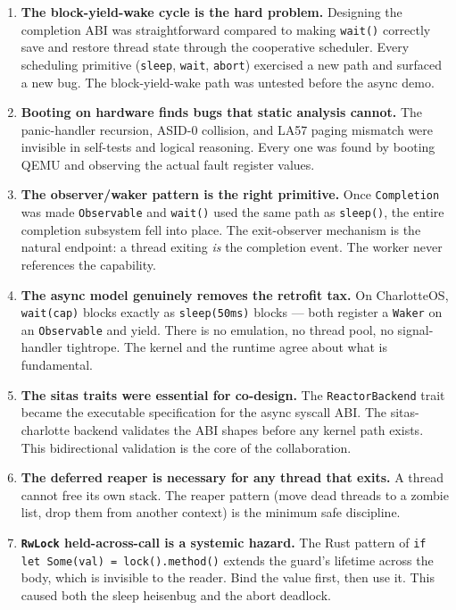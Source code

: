 \begin{enumerate}
    \item \textbf{The block-yield-wake cycle is the hard problem.} Designing
        the completion ABI was straightforward compared to making
        \texttt{wait()} correctly save and restore thread state through the
        cooperative scheduler. Every scheduling primitive (\texttt{sleep},
        \texttt{wait}, \texttt{abort}) exercised a new path and surfaced a new
        bug. The block-yield-wake path was untested before the async demo.

    \item \textbf{Booting on hardware finds bugs that static analysis cannot.}
        The panic-handler recursion, ASID-0 collision, and LA57 paging
        mismatch were invisible in self-tests and logical reasoning. Every one
        was found by booting QEMU and observing the actual fault register
        values.

    \item \textbf{The observer/waker pattern is the right primitive.} Once
        \texttt{Completion} was made \texttt{Observable} and \texttt{wait()}
        used the same path as \texttt{sleep()}, the entire completion subsystem
        fell into place. The exit-observer mechanism is the natural endpoint:
        a thread exiting \emph{is} the completion event. The worker never
        references the capability.

    \item \textbf{The async model genuinely removes the retrofit tax.} On
        CharlotteOS, \texttt{wait(cap)} blocks exactly as \texttt{sleep(50ms)}
        blocks --- both register a \texttt{Waker} on an \texttt{Observable} and
        yield. There is no emulation, no thread pool, no signal-handler
        tightrope. The kernel and the runtime agree about what is fundamental.

    \item \textbf{The sitas traits were essential for co-design.} The
        \texttt{ReactorBackend} trait became the executable specification for
        the async syscall ABI. The sitas-charlotte backend validates the ABI
        shapes before any kernel path exists. This bidirectional validation is
        the core of the collaboration.

    \item \textbf{The deferred reaper is necessary for any thread that exits.}
        A thread cannot free its own stack. The reaper pattern (move dead
        threads to a zombie list, drop them from another context) is the
        minimum safe discipline.

    \item \textbf{\texttt{RwLock} held-across-call is a systemic hazard.} The
        Rust pattern of \texttt{if let Some(val) = lock().method()} extends the
        guard's lifetime across the body, which is invisible to the reader.
        Bind the value first, then use it. This caused both the sleep heisenbug
        and the abort deadlock.
\end{enumerate}

\endinput

